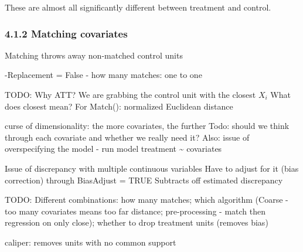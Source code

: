 \documentclass[
]{article}
\begin{document}
These are almost all significantly different between treatment and
control.

\subsubsection{4.1.2 Matching covariates}\label{matching-covariates}

Matching throws away non-matched control units

-Replacement = False - how many matches: one to one

TODO: Why ATT? We are grabbing the control unit with the closest \(X_i\)
What does closest mean? For Match(): normalized Euclidean distance

curse of dimensionality: the more covariates, the further Todo: should
we think through each covariate and whether we really need it? Also:
issue of overspecifying the model - run model treatment
\textasciitilde{} covariates

Issue of discrepancy with multiple continuous variables Have to adjust
for it (bias correction) through BiasAdjust = TRUE Subtracts off
estimated discrepancy

TODO: Different combinations: how many matches; which algorithm (Coarse
- too many covariates means too far distance; pre-processing - match
then regression on only close); whether to drop treatment units (removes
bias)

caliper: removes units with no common support
\end{document}

